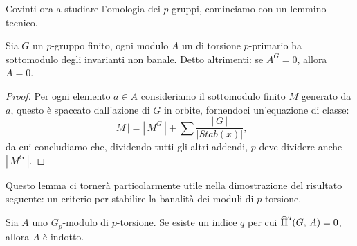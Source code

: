 Covinti ora a studiare l'omologia dei $ p $-gruppi, 
cominciamo con un lemmino tecnico.

\begin{lemma}\label{ban1}
	Sia $ G $ un $ p $-gruppo finito, ogni modulo $ A $ un di torsione $ p $-primario ha sottomodulo degli invarianti non banale. Detto altrimenti: se $ A^G = 0 $, allora $ A = 0 $.
\end{lemma}
\begin{proof}
	Per ogni elemento $ a \in A $ consideriamo il sottomodulo finito $ M $ generato da $ a $, questo è spaccato dall'azione di $ G $ in orbite, fornendoci un'equazione di classe:
	\[ |\,M\,| = |\, M^G\,| +\sum \frac{|\,G\,|}{|Stab(x)|},  \]
	da cui concludiamo che, dividendo tutti gli altri addendi, $ p $ deve dividere anche $ |\, M^G \, | $.
\end{proof}

Questo lemma ci tornerà particolarmente utile nella dimostrazione del risultato seguente: un criterio per stabilire la banalità dei moduli di $ p $-torsione.

\begin{proposition} \label{ban2}
	Sia $ A $ uno $ G_p $-modulo di $ p $-torsione. Se esiste un indice $ q $ per cui $ \operatorname{\widehat{H}}^q(G, \, A) = 0 $, allora $ A $ è indotto.
\end{proposition}

